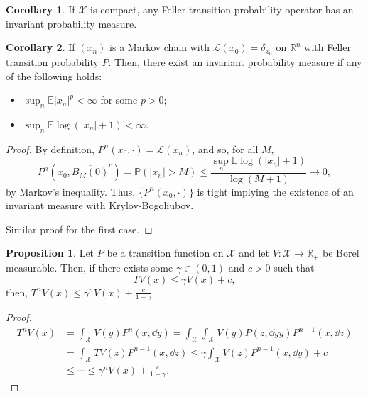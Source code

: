 \documentclass[]{article}
\theoremstyle{definition}
\newtheorem{corollary}{Corollary}[theorem]
\theoremstyle{definition}
\newtheorem{proposition}{Proposition}[section]
\begin{document}
\begin{corollary}
  If \(\mathcal{X}\) is compact, any Feller transition probability operator 
  has an invariant probability measure.
\end{corollary}

\begin{corollary}
  If \((x_n)\) is a Markov chain with \(\mathcal{L}(x_0) = \delta_{x_0}\) 
  on \(\mathbb{R}^n\) with Feller transition probability \(P\). Then, there exist 
  an invariant probability measure if any of the following holds:
  \begin{itemize}
    \item \(\sup_n \mathbb{E}|x_n|^p < \infty\) for some \(p > 0\);
    \item \(\sup_n \mathbb{E} \log(|x_n| + 1) < \infty\).
  \end{itemize}
\end{corollary}
\begin{proof}
By definition, \(P^n(x_0, \cdot) = \mathcal{L}(x_n)\), and so, for all \(M\), 
\[P^n(x_0, \overline{B_M(0)}^c) = \mathbb{P}(|x_n| > M) \le 
\frac{\sup_n \mathbb{E}\log(|x_n| + 1)}{\log(M + 1)} \to 0,\]
by Markov's inequality. Thus, \(\{P^n(x_0, \cdot)\}\) is tight implying the 
existence of an invariant measure with Krylov-Bogoliubov.

Similar proof for the first case.
\end{proof}

\begin{proposition}
Let \(P\) be a transition function on \(\mathcal{X}\) and let \(V : \mathcal{X} \to \mathbb{R}_+\)
be Borel measurable. Then, if there exists some \(\gamma \in (0, 1)\) and \(c > 0\)
such that 
\[TV(x) \le \gamma V(x) + c,\]
then, \(T^n V(x) \le \gamma^n V(x) + \frac{c}{1 - \gamma}\).
\end{proposition}
\begin{proof}
\[\begin{split}
  T^nV(x) & = \int_{\mathcal{X}} V(y) P^n(x, \dd y) 
    = \int_{\mathcal{X}} \int_{\mathcal{X}} V(y) P(z, \dd yy)P^{n - 1}(x, \dd z)\\
  & = \int_{\mathcal{X}} TV(z)P^{n - 1}(x, \dd z)
    \le \gamma \int_{\mathcal{X}} V(z) P^{n - 1}(x, \dd y) + c\\ 
  & \le \cdots \le \gamma^n V(x) + \frac{c}{1 - \gamma}.
\end{split}\]
\end{proof}
\end{document}
